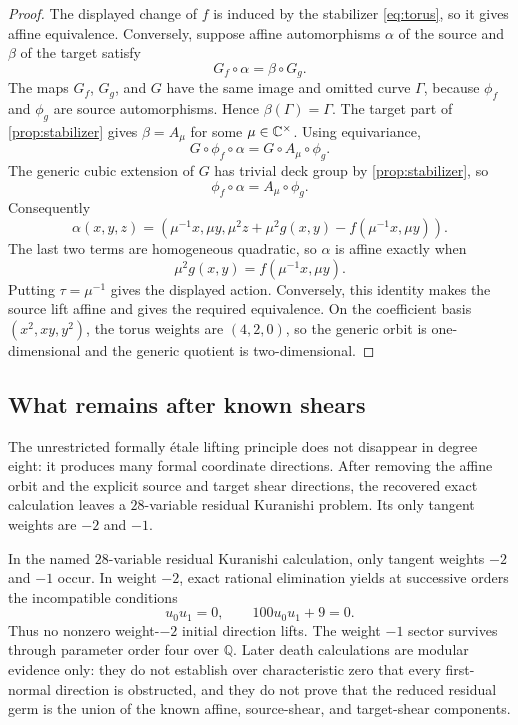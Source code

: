 \begin{proof}
The displayed change of \(f\) is induced by the stabilizer
\eqref{eq:torus}, so it gives affine equivalence.  Conversely, suppose
affine automorphisms \(\alpha\) of the source and \(\beta\) of the target
satisfy
\[
G_f\circ\alpha=\beta\circ G_g.
\]
The maps \(G_f\), \(G_g\), and \(G\) have the same image and omitted curve
\(\Gamma\), because \(\phi_f\) and \(\phi_g\) are source automorphisms.
Hence \(\beta(\Gamma)=\Gamma\).  The target part of
\cref{prop:stabilizer} gives \(\beta=A_\mu\) for some \(\mu\in\mathbb C^\times\).
Using equivariance,
\[
G\circ\phi_f\circ\alpha=G\circ A_\mu\circ\phi_g.
\]
The generic cubic extension of \(G\) has trivial deck group by
\cref{prop:stabilizer}, so
\[
\phi_f\circ\alpha=A_\mu\circ\phi_g.
\]
Consequently
\[
\alpha(x,y,z)=
\left(\mu^{-1}x,\mu y,
\mu^2z+\mu^2g(x,y)-f(\mu^{-1}x,\mu y)\right).
\]
The last two terms are homogeneous quadratic, so \(\alpha\) is affine
exactly when
\[
\mu^2g(x,y)=f(\mu^{-1}x,\mu y).
\]
Putting \(\tau=\mu^{-1}\) gives the displayed action.  Conversely, this
identity makes the source lift affine and gives the required equivalence.
On the coefficient basis \((x^2,xy,y^2)\), the torus weights are
\((4,2,0)\), so the generic orbit is one-dimensional and the generic
quotient is two-dimensional.
\end{proof}

\subsection{What remains after known shears}

The unrestricted formally \'{e}tale lifting principle does not disappear in
degree eight: it produces many formal coordinate directions.  After
removing the affine orbit and the explicit source and target shear
directions, the recovered exact calculation leaves a \(28\)-variable
residual Kuranishi problem.  Its only tangent weights are \(-2\) and \(-1\).

\begin{proposition}
\label{thm:degree-eight-transverse}
In the named \(28\)-variable residual Kuranishi calculation, only tangent
weights \(-2\) and \(-1\) occur.  In weight \(-2\), exact rational
elimination yields at successive orders the
incompatible conditions
\[
u_0u_1=0,\qquad 100u_0u_1+9=0.
\]
Thus no nonzero weight-\(-2\) initial direction lifts.  The weight \(-1\)
sector survives through parameter order four over \(\mathbb Q\).  Later
death calculations are modular evidence only: they do not establish over
characteristic zero that every first-normal direction is obstructed, and
they do not prove that the reduced residual germ is the union of the known
affine, source-shear, and target-shear components.
\end{proposition}

